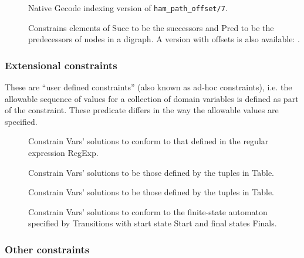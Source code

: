 \begin{description}
\item[]
Native Gecode indexing version of {\tt ham_path_offset/7}.

\item[]
Constrains elements of Succ to be the successors and
Pred to be the predecessors of nodes in a digraph. A version with offsets
is also available:
.

\end{description}
 
\subsubsection{Extensional constraints}
These are ``user defined constraints'' (also known as ad-hoc
 constraints), i.e. the allowable sequence of values for a
collection of domain variables is defined as part of the constraint. These
predicate differs in the way the allowable values are specified.

\begin{description}
\item[]
Constrain Vars' solutions to conform to that defined in the regular expression RegExp.

\item[]
Constrain Vars' solutions to be those defined by the tuples in Table.

\item[]
Constrain Vars' solutions to be those defined by the tuples in Table.

\item[]
Constrain Vars' solutions to conform to the finite-state 
automaton specified by Transitions with start state Start and  final states Finals.

\end{description}

\subsubsection{Other constraints}


